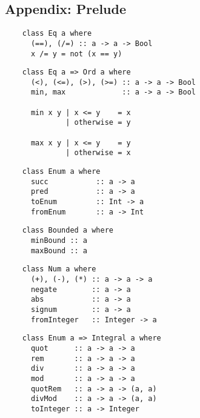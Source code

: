 


\clearpage

\begin{multicols}{2}\footnotesize 
	
	\section*{Appendix: Prelude}
	
	\begin{verbatim}
	class Eq a where
	  (==), (/=) :: a -> a -> Bool
	  x /= y = not (x == y)
	\end{verbatim}
	
	\begin{verbatim}
	class Eq a => Ord a where
	  (<), (<=), (>), (>=) :: a -> a -> Bool
	  min, max             :: a -> a -> Bool
	
	  min x y | x <= y    = x
	          | otherwise = y
	
	  max x y | x <= y    = y
	          | otherwise = x
	\end{verbatim}
	
	\begin{verbatim}
	class Enum a where
	  succ           :: a -> a 
	  pred           :: a -> a
	  toEnum         :: Int -> a
	  fromEnum       :: a -> Int 
	\end{verbatim}
	
	\begin{verbatim}
	class Bounded a where
	  minBound :: a 
	  maxBound :: a
	\end{verbatim}
	
	\begin{verbatim}
	class Num a where 
	  (+), (-), (*) :: a -> a -> a
	  negate        :: a -> a
	  abs           :: a -> a
	  signum        :: a -> a
	  fromInteger   :: Integer -> a
	\end{verbatim}
	
	\begin{verbatim}
	class Enum a => Integral a where 
	  quot      :: a -> a -> a
	  rem       :: a -> a -> a
	  div       :: a -> a -> a
	  mod       :: a -> a -> a
	  quotRem   :: a -> a -> (a, a)
	  divMod    :: a -> a -> (a, a)
	  toInteger :: a -> Integer
	\end{verbatim}
	

\end{multicols}
